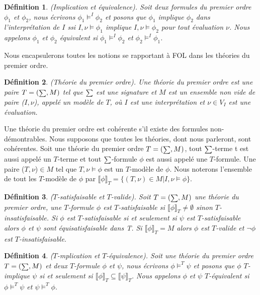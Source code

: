 \documentclass[9pt]{book}
\newcommand\phibra{\llbracket\phi\rrbracket}
\newcommand\psibra{\llbracket\psi\rrbracket}
\newtheorem{definition}{D\'efinition}[section]
\begin{document}
\begin{definition}
(Implication et \'equivalence). Soit deux formules du premier ordre $\phi_{1}$ et $\phi_{2}$, nous \'ecrivons $\phi_{1}\models^{I}\phi_{2}$ et posons que $\phi_{1}$ implique $\phi_{2}$ dans l'interpr\'etation de $I$ ssi $I,\nu\models\phi_{1}$ implique $I,\nu\models\phi_{2}$ pour tout \'evaluation $\nu$. Nous appelons $\phi_{1}$  et $\phi_{2}$  \'equivalent si $\phi_{1}\models^{I}\phi_{2}$ et $\phi_{2}\models^{I}\phi_{1}$.
\end{definition}\par
Nous encapsulerons toutes les notions se rapportant \`a FOL dans les th\'eories du premier ordre.

\begin{definition}
(Th\'eorie du premier ordre). Une th\'eorie du premier ordre est une paire $T=(\mathsmaller \sum,M)$ tel que $\mathsmaller \sum$ est une signature et $M$ est un ensemble non vide de paire ($I,\nu$), appel\'e un mod\`ele de $T$, o\`u $I$ est une interpr\'etation et $\nu\in V_{I}$ est une \'evaluation.
\end{definition}

Une th\'eorie du premier ordre est coh\'erente s'il existe des formules non-d\'emontrables. Nous supposons que toutes les th\'eories, dont nous parleront, sont coh\'erentes. Soit une th\'eorie du premier ordre $T = (\mathsmaller \sum,M)$, tout $\mathsmaller \sum$-terme t est aussi appel\'e un $T$-terme et tout $\mathsmaller \sum$-formule $\phi$ est aussi appel\'e une $T$-formule. Une paire ($T,\nu$)$\in M$ tel que $T,\nu\models\phi$ est un $T$-mod\`ele de $\phi$. Nous noterons l'ensemble de tout les $T$-mod\`ele de $\phi$ par $\phibra_{T} = \{(T,\nu)\in M | I,\nu\models\phi\}$.

\begin{definition}
($T$-satisfaisable et $T$-valide). Soit $T = (\mathsmaller\sum,M)$ une th\'eorie du premier ordre, une $T$-formule $\phi$ est $T$-satisfaisable si $\phibra_{T} \neq \emptyset$ sinon $T$-insatisfaisable. Si $\phi$ est $T$-satisfaisable si et seulement si $\psi$ est $T$-satisfaisable alors $\phi$ et $\psi$ sont \'equisatisfaisable dans T. Si $\phibra_{T} = M$ alors $\phi$ est $T$-valide et $\neg\phi$ est $T$-insatisfaisable.
\end{definition}

\begin{definition}
($T$-mplication et $T$-\'equivalence). Soit une th\'eorie du premier ordre $T = (\mathsmaller \sum,M)$ et deux $T$-formule $\phi$ et $\psi$, nous \'ecrivons $\phi\models^{T}\psi$ et posons que $\phi$ $T$-implique $\psi$ si et seulement si $\phibra_{T}\subseteq \psibra_{T}$. Nous appelons $\phi$  et $\psi$  $T$-\'equivalent si $\phi\models^{T}\psi$ et $\psi\models^{T}\phi$.
\end{definition}\par
\end{document}
